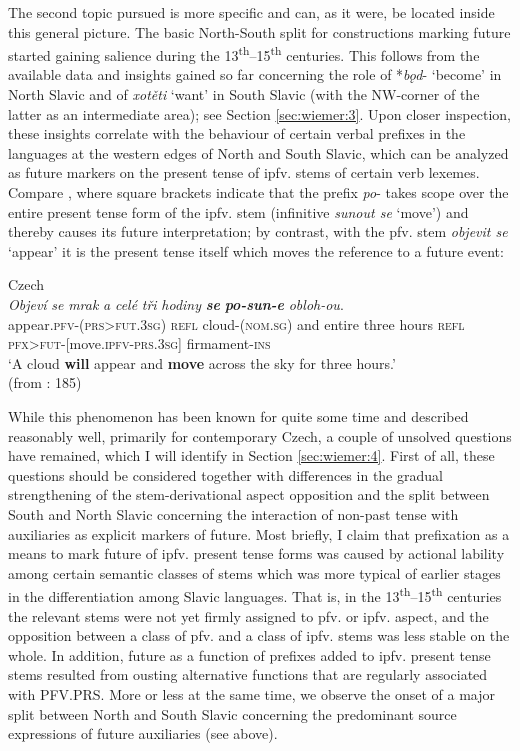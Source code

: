 \documentclass[output=paper,colorlinks,citecolor=brown]{langscibook}
\begin{document}
The second topic pursued is more specific and can, as it were, be located inside this general picture. The basic North-South split for constructions marking future started gaining salience during the 13\textsuperscript{th}--15\textsuperscript{th} centuries. This follows from the available data and insights gained so far concerning the role of *\textit{bǫd}- ‘become’ in North Slavic and of \textit{xotěti} ‘want’ in South Slavic (with the NW-corner of the latter as an intermediate area); see Section \ref{sec:wiemer:3}. Upon closer inspection, these insights correlate with the behaviour of certain verbal prefixes in the languages at the western edges of North and South Slavic, which can be analyzed as future markers on the present tense of ipfv. stems of certain verb lexemes. Compare , where square brackets indicate that the prefix \textit{po}- takes scope over the entire present tense form of the ipfv. stem (infinitive \textit{sunout se} ‘move’) and thereby causes its future interpretation; by contrast, with the pfv. stem \textit{objevit se} ‘appear’ it is the present tense itself which moves the reference to a future event:

\ea Czech \label{ex:wiemer:1}\\
    \gll \textit{Objeví} \textit{se} \textit{mrak} \textit{a} \textit{celé} \textit{tři} \textit{hodiny} \textit{\textbf{se}} \textit{\textbf{po-sun-e}} \textit{obloh-ou}.\\
    appear.\textsc{pfv-(prs>fut.3sg)} \textsc{refl} cloud-\textsc{(nom.sg)} and entire three hours \textsc{refl} \textsc{pfx>fut-}[move.\textsc{ipfv-prs.3sg}] firmament-\textsc{ins}\\
    \glt `A cloud \textbf{will} appear and \textbf{move} across the sky for three hours.’\\
    \hfill (from \cite{ŠevčíkováPanevová2018}: 185)
\z

While this phenomenon has been known for quite some time and described reasonably well, primarily for contemporary Czech, a couple of unsolved questions have remained, which I will identify in Section \ref{sec:wiemer:4}. First of all, these questions should be considered together with differences in the gradual strengthening of the stem\hyp{}derivational aspect opposition and the split between South and North Slavic concerning the interaction of non-past tense with auxiliaries as explicit markers of future. Most briefly, I claim that prefixation as a means to mark future of ipfv. present tense forms was caused by actional lability among certain semantic classes of stems which was more typical of earlier stages in the differentiation among Slavic languages. That is, in the 13\textsuperscript{th}--15\textsuperscript{th} centuries the relevant stems were not yet firmly assigned to pfv. or ipfv. aspect, and the opposition between a class of pfv. and a class of ipfv. stems was less stable on the whole. In addition, future as a function of prefixes added to ipfv. present tense stems resulted from ousting alternative functions that are regularly associated with PFV.PRS. More or less at the same time, we observe the onset of a major split between North and South Slavic concerning the predominant source expressions of future auxiliaries (see above).
\end{document}
